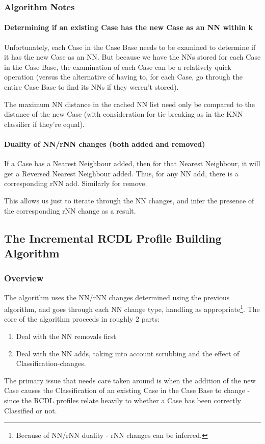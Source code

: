 \documentclass[a4paper,11pt]{report}
\begin{document}
\subsubsection{Algorithm Notes}
\paragraph{Determining if an existing Case has the new Case as an NN within k}
Unfortunately, each Case in the Case Base needs to be examined to determine if it has the new Case as an NN. But because we have the NNs stored for each Case in the Case Base, the examination of each Case can be a relatively quick operation (versus the alternative of having to, for each Case, go through the entire Case Base to find its NNs if they weren't stored).

The maximum NN distance in the cached NN list need only be compared to the distance of the new Case (with consideration for tie breaking as in the KNN classifier if they're equal).

\paragraph{Duality of NN/rNN changes (both added and removed)}
If a Case has a Nearest Neighbour added, then for that Nearest Neighbour, it will get a Reversed Nearest Neighbour added. Thus, for any NN add, there is a corresponding rNN add. Similarly for remove.

This allows us just to iterate through the NN changes, and infer the presence of the corresponding rNN change as a result.

\subsection{The Incremental RCDL Profile Building Algorithm}
\begin{samepage}
\subsubsection{Overview}
The algorithm uses the NN/rNN changes determined using the previous algorithm, and goes through each NN change type, handling as appropriate\footnote{Because of NN/rNN duality - rNN changes can be inferred.}. The core of the algorithm proceeds in roughly 2 parts:
\begin{enumerate}
	\item Deal with the NN removals first
	\item Deal with the NN adds, taking into account scrubbing and the effect of Classification-changes.
\end{enumerate}

The primary issue that needs care taken around is when the addition of the new Case causes the Classification of an existing Case in the Case Base to change - since the RCDL profiles relate heavily to whether a Case has been correctly Classified or not.


\end{samepage}
\end{document}
